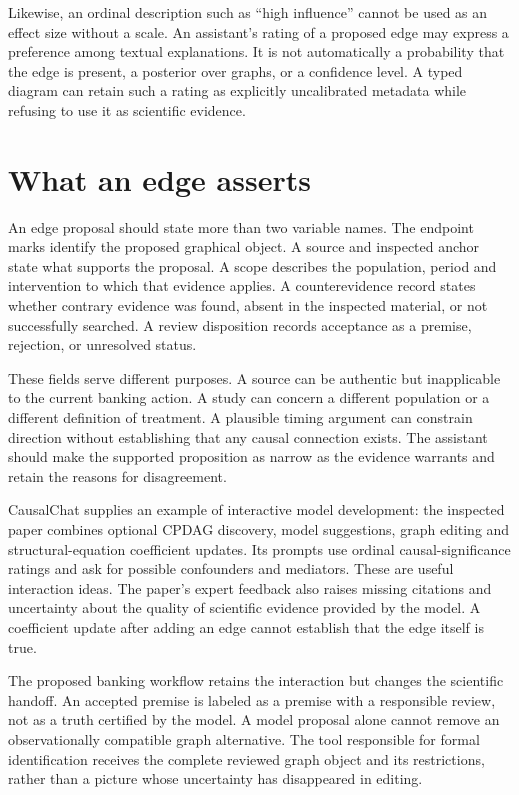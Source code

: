 Likewise, an ordinal description such as ``high influence'' cannot be used
as an effect size without a scale. An assistant's rating of a proposed edge
may express a preference among textual explanations. It is not automatically
a probability that the edge is present, a posterior over graphs, or a
confidence level. A typed diagram can retain such a rating as explicitly
uncalibrated metadata while refusing to use it as scientific evidence.

\section{What an edge asserts}

An edge proposal should state more than two variable names. The endpoint
marks identify the proposed graphical object. A source and inspected anchor
state what supports the proposal. A scope describes the population, period
and intervention to which that evidence applies. A counterevidence record
states whether contrary evidence was found, absent in the inspected material,
or not successfully searched. A review disposition records acceptance as a
premise, rejection, or unresolved status.

These fields serve different purposes. A source can be authentic but
inapplicable to the current banking action. A study can concern a different
population or a different definition of treatment. A plausible timing argument
can constrain direction without establishing that any causal connection
exists. The assistant should make the supported proposition as narrow as
the evidence warrants and retain the reasons for disagreement.

CausalChat supplies an example of interactive model development: the inspected
paper combines optional CPDAG discovery, model suggestions, graph editing
and structural-equation coefficient updates. Its prompts use ordinal
causal-significance ratings and ask for possible confounders and mediators.
These are useful interaction ideas. The paper's expert feedback also raises
missing citations and uncertainty about the quality of scientific evidence
provided by the model. A coefficient update after adding an edge cannot
establish that the edge itself is true. \cite{v12_la_2410_14146}

The proposed banking workflow retains the interaction but changes the
scientific handoff. An accepted premise is labeled as a premise with a
responsible review, not as a truth certified by the model. A model proposal
alone cannot remove an observationally compatible graph alternative. The
tool responsible for formal identification receives the complete reviewed
graph object and its restrictions, rather than a picture whose uncertainty
has disappeared in editing.

